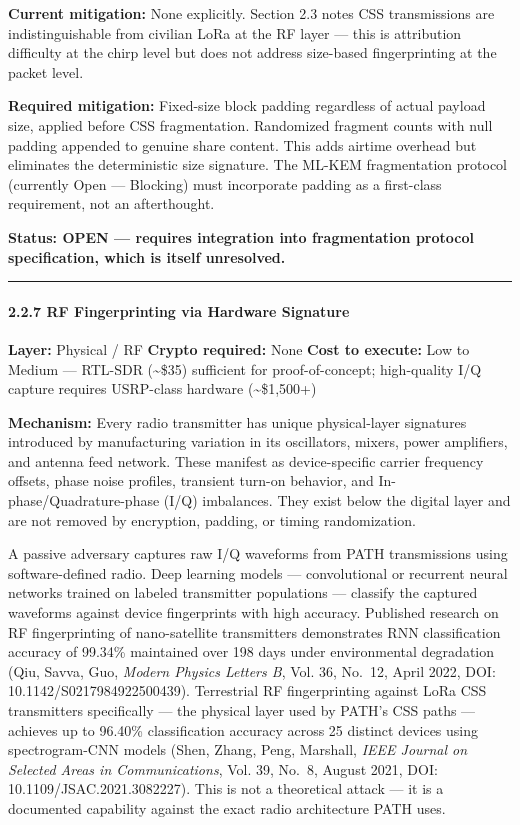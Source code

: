 \documentclass[
  11pt,
]{article}
\begin{document}
\textbf{Current mitigation:} None explicitly. Section 2.3 notes CSS
transmissions are indistinguishable from civilian LoRa at the RF layer
--- this is attribution difficulty at the chirp level but does not
address size-based fingerprinting at the packet level.

\textbf{Required mitigation:} Fixed-size block padding regardless of
actual payload size, applied before CSS fragmentation. Randomized
fragment counts with null padding appended to genuine share content.
This adds airtime overhead but eliminates the deterministic size
signature. The ML-KEM fragmentation protocol (currently Open ---
Blocking) must incorporate padding as a first-class requirement, not an
afterthought.

\textbf{Status: OPEN --- requires integration into fragmentation
protocol specification, which is itself unresolved.}

\begin{center}\rule{0.5\linewidth}{0.5pt}\end{center}

\hypertarget{rf-fingerprinting-via-hardware-signature}{%
\paragraph{2.2.7 RF Fingerprinting via Hardware
Signature}\label{rf-fingerprinting-via-hardware-signature}}

\textbf{Layer:} Physical / RF \textbf{Crypto required:} None
\textbf{Cost to execute:} Low to Medium --- RTL-SDR
(\textasciitilde\$35) sufficient for proof-of-concept; high-quality I/Q
capture requires USRP-class hardware (\textasciitilde\$1,500+)

\textbf{Mechanism:} Every radio transmitter has unique physical-layer
signatures introduced by manufacturing variation in its oscillators,
mixers, power amplifiers, and antenna feed network. These manifest as
device-specific carrier frequency offsets, phase noise profiles,
transient turn-on behavior, and In-phase/Quadrature-phase (I/Q)
imbalances. They exist below the digital layer and are not removed by
encryption, padding, or timing randomization.

A passive adversary captures raw I/Q waveforms from PATH transmissions
using software-defined radio. Deep learning models --- convolutional or
recurrent neural networks trained on labeled transmitter populations ---
classify the captured waveforms against device fingerprints with high
accuracy. Published research on RF fingerprinting of nano-satellite
transmitters demonstrates RNN classification accuracy of 99.34\%
maintained over 198 days under environmental degradation (Qiu, Savva,
Guo, \emph{Modern Physics Letters B}, Vol. 36, No.~12, April 2022, DOI:
10.1142/S0217984922500439). Terrestrial RF fingerprinting against LoRa
CSS transmitters specifically --- the physical layer used by PATH's CSS
paths --- achieves up to 96.40\% classification accuracy across 25
distinct devices using spectrogram-CNN models (Shen, Zhang, Peng,
Marshall, \emph{IEEE Journal on Selected Areas in Communications}, Vol.
39, No.~8, August 2021, DOI: 10.1109/JSAC.2021.3082227). This is not a
theoretical attack --- it is a documented capability against the exact
radio architecture PATH uses.
\end{document}
